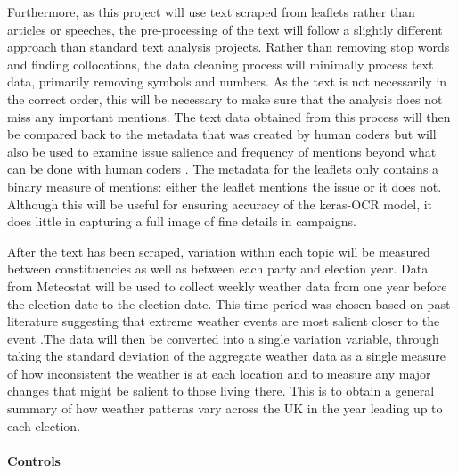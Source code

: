 \documentclass[12pt,letterpaper]{article}
\begin{document}
Furthermore, as this project will use text scraped from leaflets rather than articles or speeches, the pre-processing of the text will follow a slightly different approach than standard text analysis projects. Rather than removing stop words and finding collocations, the data cleaning process will minimally process text data, primarily removing symbols and numbers. As the text is not necessarily in the correct order, this will be necessary to make sure that the analysis does not miss any important mentions. The text data obtained from this process will then be compared back to the metadata that was created by human coders but will also be used to examine issue salience and frequency of mentions beyond what can be done with human coders \autocite{trummParliamentaryCandidatesTheir2023a}. The metadata for the leaflets only contains a binary measure of mentions: either the leaflet mentions the issue or it does not. Although this will be useful for ensuring accuracy of the keras-OCR model, it does little in capturing a full image of fine details in campaigns. 
 


After the text has been scraped, variation within each topic will be measured between constituencies as well as between each party and election year. Data from Meteostat \autocite{MeteostatPyPI} will be used to collect weekly weather data from one year before the election date to the election date. This time period was chosen based on past literature suggesting that extreme weather events are most salient closer to the event \autocite{viscontiEffectDifferentExtreme2024}.The data will then be converted into a single variation variable, through taking the standard deviation of the aggregate weather data as a single measure of how inconsistent the weather is at each location and to measure any major changes that might be salient to those living there. This is to obtain a general summary of how weather patterns vary across the UK in the year leading up to each election.


\paragraph{Controls}
\end{document}

